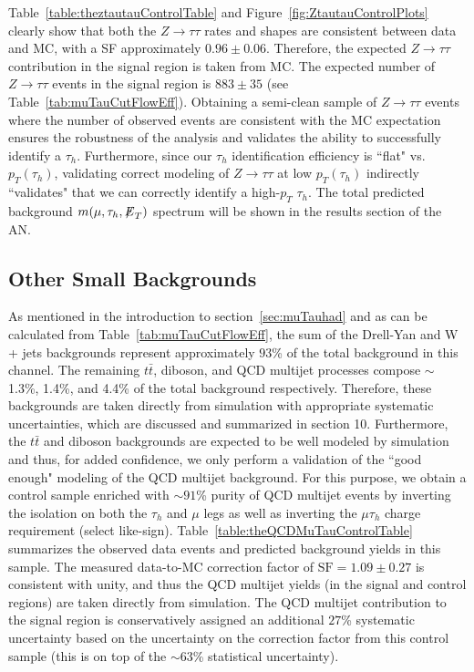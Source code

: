 Table~\ref{table:theztautauControlTable} and Figure~\ref{fig:ZtautauControlPlots} clearly show that both the $Z \to \tau\tau$ rates and shapes are consistent 
between data and MC, with a SF approximately $0.96 \pm 0.06$. Therefore, the expected $Z \to \tau\tau$ contribution in the signal region is taken from MC. The 
expected number of $Z \to \tau\tau$ events in the signal region is $883 \pm 35$ (see Table~\ref{tab:muTauCutFlowEff}). 
Obtaining a semi-clean sample of $Z \to \tau\tau$ events where the number of observed events are consistent with the MC expectation ensures the robustness of the 
analysis and validates the ability to successfully identify a $\tau_{h}$. Furthermore, since our $\tau_{h}$ identification efficiency is ``flat" vs. 
$p_{T}(\tau_{h})$, validating correct modeling of $Z \to \tau\tau$ at low $p_{T}(\tau_{h})$ indirectly ``validates" that we can correctly identify a high-$p_{T}$ 
$\tau_{h}$. The total predicted background $m(\mu,\tau_{h},{\not\mathrel{E}}_T)$ spectrum will be shown in the results section of the AN.

\subsection{Other Small Backgrounds}

As mentioned in the introduction to section~\ref{sec:muTauhad} and as can be calculated from Table~\ref{tab:muTauCutFlowEff}, the sum of the Drell-Yan and W + 
jets backgrounds represent approximately $93$\% of the total background in this channel. The remaining $t\bar{t}$, diboson, and QCD multijet processes compose 
$\sim$ 1.3\%, 1.4\%, and 4.4\% of the total background respectively. Therefore, these backgrounds are taken directly from simulation with appropriate systematic 
uncertainties, which are discussed and summarized in section 10. Furthermore, the $t\bar{t}$ and diboson backgrounds are expected to be well modeled by simulation 
and thus, for added confidence, we only perform a validation of the ``good enough" modeling of the QCD multijet background. For this purpose, we obtain a control 
sample enriched with $\sim 91$\% purity of QCD multijet events by inverting the isolation on both the $\tau_{h}$ and $\mu$ legs as well as inverting the 
$\mu\tau_{h}$ charge requirement (select like-sign). Table~\ref{table:theQCDMuTauControlTable} summarizes the observed data events and predicted background yields 
in this sample. The measured data-to-MC correction factor of $\textrm{SF}=1.09 \pm 0.27$ is consistent with unity, and thus the QCD multijet yields (in the 
signal and control regions) are taken directly from simulation. The QCD multijet contribution to the signal region is conservatively assigned an additional $27$\% 
systematic uncertainty based on the uncertainty on the correction factor from this control sample (this is on top of the $\sim 63$\% statistical uncertainty).

